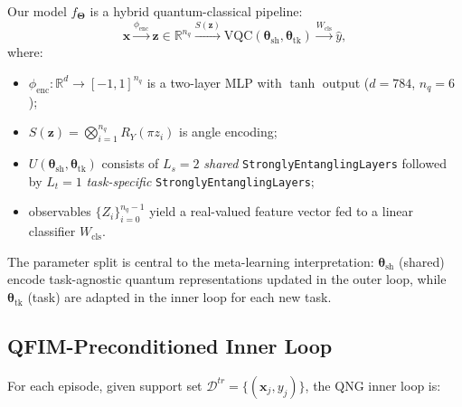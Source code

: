 \documentclass[a4paper,nopdfoutputerror]{quantumarticle}
\begin{document}
Our model $f_{\boldsymbol{\Theta}}$ is a hybrid quantum-classical pipeline:
\begin{equation}
  \mathbf{x} \xrightarrow{\phi_{\mathrm{enc}}}
  \mathbf{z} \in \mathbb{R}^{n_q} \xrightarrow{S(\mathbf{z})}
  \text{VQC}(\boldsymbol{\theta}_{\mathrm{sh}}, \boldsymbol{\theta}_{\mathrm{tk}})
  \xrightarrow{W_{\mathrm{cls}}} \hat{y},
\end{equation}
where:
\begin{itemize}
  \item $\phi_{\mathrm{enc}}: \mathbb{R}^{d} \to [-1,1]^{n_q}$ is a
        two-layer MLP with $\tanh$ output ($d=784$, $n_q = 6$);
  \item $S(\mathbf{z}) = \bigotimes_{i=1}^{n_q} R_Y(\pi z_i)$ is
        angle encoding;
  \item $U(\boldsymbol{\theta}_{\mathrm{sh}}, \boldsymbol{\theta}_{\mathrm{tk}})$
        consists of $L_s = 2$ \emph{shared} \texttt{StronglyEntanglingLayers}
        followed by $L_t = 1$ \emph{task-specific}
        \texttt{StronglyEntanglingLayers};
  \item observables $\{Z_i\}_{i=0}^{n_q-1}$ yield a real-valued
        feature vector fed to a linear classifier $W_{\mathrm{cls}}$.
\end{itemize}

The parameter split is central to the meta-learning interpretation:
$\boldsymbol{\theta}_{\mathrm{sh}}$ (shared) encode task-agnostic
quantum representations updated in the outer loop, while
$\boldsymbol{\theta}_{\mathrm{tk}}$ (task) are adapted in the inner loop
for each new task.

\subsection{QFIM-Preconditioned Inner Loop}

For each episode, given support set
$\mathcal{D}^{tr} = \{(\mathbf{x}_j, y_j)\}$, the QNG inner loop is:
\end{document}
